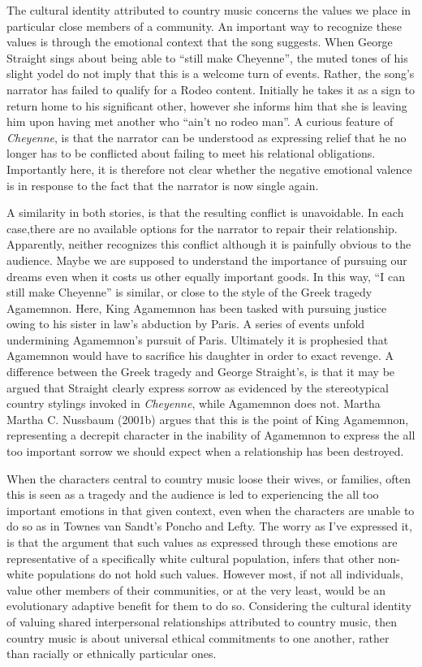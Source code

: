 \documentclass[
  letterpaper,
  DIV=11,
  numbers=noendperiod]{scrartcl}
\theoremstyle{remark}
\begin{document}
The cultural identity attributed to country music concerns the values we
place in particular close members of a community. An important way to
recognize these values is through the emotional context that the song
suggests. When George Straight sings about being able to ``still make
Cheyenne'', the muted tones of his slight yodel do not imply that this
is a welcome turn of events. Rather, the song's narrator has failed to
qualify for a Rodeo content. Initially he takes it as a sign to return
home to his significant other, however she informs him that she is
leaving him upon having met another who ``ain't no rodeo man''. A
curious feature of \emph{Cheyenne}, is that the narrator can be
understood as expressing relief that he no longer has to be conflicted
about failing to meet his relational obligations. Importantly here, it
is therefore not clear whether the negative emotional valence is in
response to the fact that the narrator is now single again.

A similarity in both stories, is that the resulting conflict is
unavoidable. In each case,there are no available options for the
narrator to repair their relationship. Apparently, neither recognizes
this conflict although it is painfully obvious to the audience. Maybe we
are supposed to understand the importance of pursuing our dreams even
when it costs us other equally important goods. In this way, ``I can
still make Cheyenne'' is similar, or close to the style of the Greek
tragedy Agamemnon. Here, King Agamemnon has been tasked with pursuing
justice owing to his sister in law's abduction by Paris. A series of
events unfold undermining Agamemnon's pursuit of Paris. Ultimately it is
prophesied that Agamemnon would have to sacrifice his daughter in order
to exact revenge. A difference between the Greek tragedy and George
Straight's, is that it may be argued that Straight clearly express
sorrow as evidenced by the stereotypical country stylings invoked in
\emph{Cheyenne}, while Agamemnon does not. Martha Martha C. Nussbaum
(2001b) argues that this is the point of King Agamemnon, representing a
decrepit character in the inability of Agamemnon to express the all too
important sorrow we should expect when a relationship has been
destroyed.

When the characters central to country music loose their wives, or
families, often this is seen as a tragedy and the audience is led to
experiencing the all too important emotions in that given context, even
when the characters are unable to do so as in Townes van Sandt's Poncho
and Lefty. The worry as I've expressed it, is that the argument that
such values as expressed through these emotions are representative of a
specifically white cultural population, infers that other non-white
populations do not hold such values. However most, if not all
individuals, value other members of their communities, or at the very
least, would be an evolutionary adaptive benefit for them to do so.
Considering the cultural identity of valuing shared interpersonal
relationships attributed to country music, then country music is about
universal ethical commitments to one another, rather than racially or
ethnically particular ones.
\end{document}

